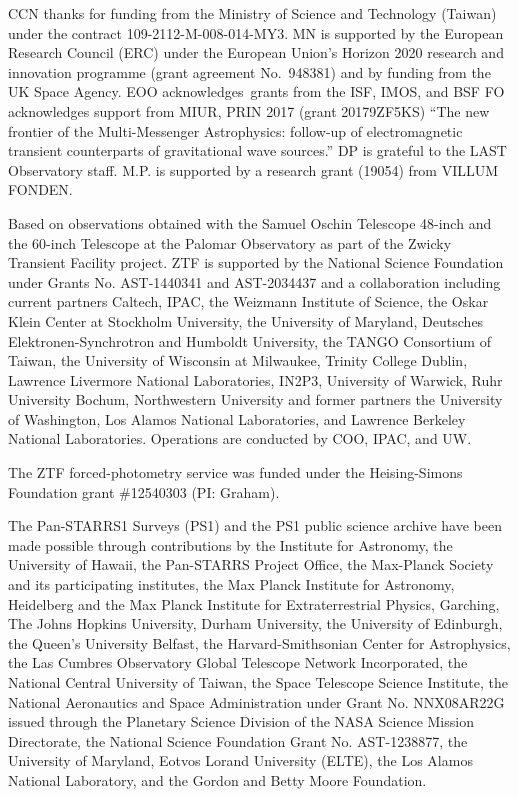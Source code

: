 \documentclass{nature_plusfigure}
\begin{document}
\begin{addendum}
CCN thanks for funding from the Ministry of Science and Technology (Taiwan) under the contract 109-2112-M-008-014-MY3.
MN is supported by the European Research Council (ERC) under the European Union’s Horizon 2020 research and innovation programme (grant agreement No.~948381) and by funding from the UK Space Agency.
EOO acknowledges grants from the ISF, IMOS, and BSF
FO acknowledges support from MIUR, PRIN 2017 (grant 20179ZF5KS) ``The new frontier of the Multi-Messenger Astrophysics: follow-up of electromagnetic transient counterparts of gravitational wave sources.''
DP is grateful to the LAST Observatory staff.
M.P. is supported by a research grant (19054) from VILLUM FONDEN.

Based on observations obtained with the Samuel Oschin Telescope 48-inch and the 60-inch Telescope at the Palomar Observatory as part of the Zwicky Transient Facility project. ZTF is supported by the National Science Foundation under Grants No. AST-1440341 and AST-2034437 and a collaboration including current partners Caltech, IPAC, the Weizmann Institute of Science, the Oskar Klein Center at Stockholm University, the University of Maryland, Deutsches Elektronen-Synchrotron and Humboldt University, the TANGO Consortium of Taiwan, the University of Wisconsin at Milwaukee, Trinity College Dublin, Lawrence Livermore National Laboratories, IN2P3, University of Warwick, Ruhr University Bochum, Northwestern University and former partners the University of Washington, Los Alamos National Laboratories, and Lawrence Berkeley National Laboratories. Operations are conducted by COO, IPAC, and UW.

The ZTF forced-photometry service was funded under the Heising-Simons Foundation grant \#12540303 (PI: Graham).

The Pan-STARRS1 Surveys (PS1) and the PS1 public science archive have been made possible through contributions by the Institute for Astronomy, the University of Hawaii, the Pan-STARRS Project Office, the Max-Planck Society and its participating institutes, the Max Planck Institute for Astronomy, Heidelberg and the Max Planck Institute for Extraterrestrial Physics, Garching, The Johns Hopkins University, Durham University, the University of Edinburgh, the Queen's University Belfast, the Harvard-Smithsonian Center for Astrophysics, the Las Cumbres Observatory Global Telescope Network Incorporated, the National Central University of Taiwan, the Space Telescope Science Institute, the National Aeronautics and Space Administration under Grant No. NNX08AR22G issued through the Planetary Science Division of the NASA Science Mission Directorate, the National Science Foundation Grant No. AST-1238877, the University of Maryland, Eotvos Lorand University (ELTE), the Los Alamos National Laboratory, and the Gordon and Betty Moore Foundation.


\end{addendum}
\end{document}

